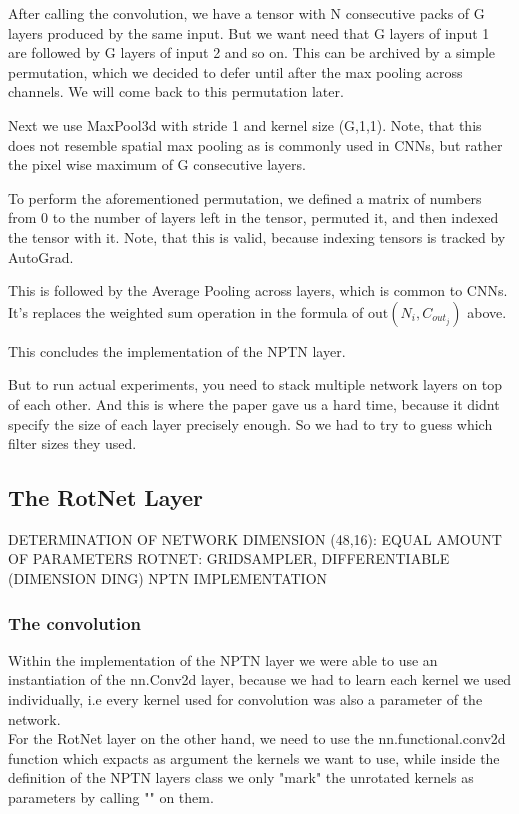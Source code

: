 \documentclass{llncs}
\begin{document}
After calling the convolution, we have a tensor with N consecutive packs of G layers produced by the same input. But we want need that G layers of input 1 are followed by G layers of input 2 and so on. This can be archived by a simple permutation, which we decided to defer until after the max pooling across channels. We will come back to this permutation later.

Next we use MaxPool3d with stride 1 and kernel size (G,1,1). Note, that this does not resemble spatial max pooling as is commonly used in CNNs, but rather the pixel wise maximum of G consecutive layers.

To perform the aforementioned permutation, we defined a matrix of numbers from 0 to the number of layers left in the tensor, permuted it, and then indexed the tensor with it. Note, that this is valid, because indexing tensors is tracked by AutoGrad.

This is followed by the Average Pooling across layers, which is common to CNNs. It's replaces the weighted sum operation in the formula of $\text{out}(N_i, C_{out_j})$ above.

This concludes the implementation of the NPTN layer.

But to run actual experiments, you need to stack multiple network layers on
top of each other. And this is where the paper gave us a hard time, because it
didnt specify the size of each layer precisely enough. So we had to try to guess
which filter sizes they used.

\subsection{The RotNet Layer}
DETERMINATION OF NETWORK DIMENSION (48,16): EQUAL AMOUNT
OF PARAMETERS
ROTNET: GRIDSAMPLER, DIFFERENTIABLE
(DIMENSION DING)
NPTN IMPLEMENTATION

\subsubsection{The convolution}
Within the implementation of the NPTN layer we were able to use an instantiation of the nn.Conv2d layer, because we had to learn each kernel we used individually, i.e every kernel used for convolution was also a parameter of the network.\\
For the RotNet layer on the other hand, we need to use the nn.functional.conv2d function which expacts as argument the kernels we want to use, while inside the definition of the NPTN layers class we only "mark" the unrotated kernels as parameters by calling "" on them.
\end{document}
